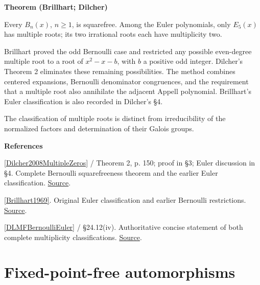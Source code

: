 \documentclass[11pt,a4paper,oneside,openany]{book}
\newenvironment{sources}{\par\smallskip\begingroup\footnotesize\color{atlasgray}\leftskip=10pt\setlength{\parskip}{2pt}}{\par\endgroup\smallskip}
\begin{document}
\begin{atlasblock}[standard]
\textbf{\sffamily Theorem (Brillhart; Dilcher)}\par\smallskip
\color{black} Every \(B_n(x)\), \(n\ge1\), is squarefree. Among the Euler polynomials, only \(E_5(x)\) has multiple roots; its two irrational roots each have multiplicity two.\par
\end{atlasblock}\color{black}
\color{black} Brillhart proved the odd Bernoulli case and restricted any possible even-degree multiple root to a root of \(x^2-x-b\), with \(b\) a positive odd integer. Dilcher's Theorem 2 eliminates these remaining possibilities. The method combines centered expansions, Bernoulli denominator congruences, and the requirement that a multiple root also annihilate the adjacent Appell polynomial. Brillhart's Euler classification is also recorded in Dilcher's §4.\par
\color{black} The classification of multiple roots is distinct from irreducibility of the normalized factors and determination of their Galois groups.\par
\begin{sources}
\textbf{References}\par\smallskip
\noindent\hyperlink{ref:Dilcher2008MultipleZeros}{[Dilcher2008MultipleZeros]} / Theorem 2, p. 150; proof in §3; Euler discussion in §4. Complete Bernoulli squarefreeness theorem and the earlier Euler classification. \href{https://doi.org/10.4064/aa134-2-6}{Source}.\par
\noindent\hyperlink{ref:Brillhart1969}{[Brillhart1969]}. Original Euler classification and earlier Bernoulli restrictions. \href{https://doi.org/10.1515/crll.1969.234.45}{Source}.\par
\noindent\hyperlink{ref:DLMFBernoulliEuler}{[DLMFBernoulliEuler]} / §24.12(iv). Authoritative concise statement of both complete multiplicity classifications. \href{https://dlmf.nist.gov/24}{Source}.\par
\end{sources}\color{black}
\section{Fixed-point-free automorphisms}
\end{document}

